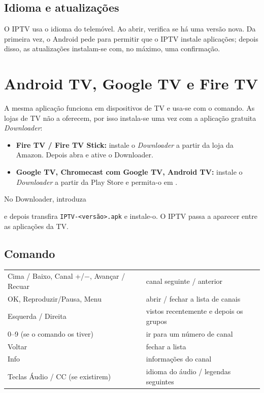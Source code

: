\subsection{Idioma e atualizações}
O IPTV usa o idioma do telemóvel. Ao abrir, verifica se há uma versão nova.
Da primeira vez, o Android pede para permitir que o IPTV instale aplicações;
depois disso, as atualizações instalam-se com, no máximo, uma confirmação.

\section{Android TV, Google TV e Fire TV}

A mesma aplicação funciona em dispositivos de TV e usa-se com o comando. As
lojas de TV não a oferecem, por isso instala-se uma vez com a aplicação
gratuita \emph{Downloader}:

\begin{itemize}
  \item \textbf{Fire TV / Fire TV Stick:} instale o \emph{Downloader} a
        partir da loja da Amazon. Depois abra  e
        ative o Downloader.
  \item \textbf{Google TV, Chromecast com Google TV, Android TV:} instale o
        \emph{Downloader} a partir da Play Store e permita-o em
        .
\end{itemize}
No Downloader, introduza
\begin{center}
  \download
\end{center}
e depois transfira \texttt{IPTV-\textless versão\textgreater.apk} e
instale-o. O IPTV passa a aparecer entre as aplicações da TV.

\subsection{Comando}
\begin{xltabular}{\linewidth}{@{}KX@{}}
Cima / Baixo, Canal +/$-$, Avançar / Recuar & canal seguinte / anterior \\
OK, Reproduzir/Pausa, Menu & abrir / fechar a lista de canais \\
Esquerda / Direita & vistos recentemente e depois os grupos \\
0--9 (se o comando os tiver) & ir para um número de canal \\
Voltar & fechar a lista \\
Info & informações do canal \\
Teclas Áudio / CC (se existirem) & idioma do áudio / legendas seguintes \\
\bottomrule
\end{xltabular}

